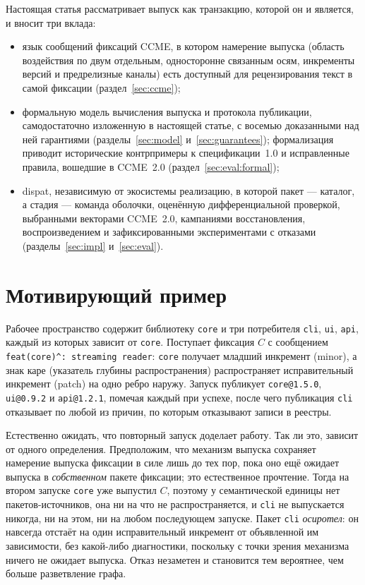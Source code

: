 \documentclass[sigconf,nonacm]{acmart}
\theoremstyle{acmplain}
\theoremstyle{acmdefinition}
\theoremstyle{acmplain}
\newcommand{\code}[1]{\texttt{#1}}
\begin{document}
Настоящая статья рассматривает выпуск как транзакцию, которой он и
является, и вносит три вклада:
\begin{itemize}
  \item язык сообщений фиксаций CCME, в котором намерение выпуска
    (область воздействия по двум отдельным, односторонне связанным осям,
    инкременты версий и
    предрелизные каналы) есть доступный для рецензирования текст в
    самой фиксации (раздел~\ref{sec:ccme});
  \item формальную модель вычисления выпуска и протокола публикации,
    самодостаточно изложенную в настоящей статье, с восемью доказанными
    над ней гарантиями (разделы~\ref{sec:model} и~\ref{sec:guarantees});
    формализация приводит исторические контрпримеры к спецификации~1.0
    и исправленные правила, вошедшие в CCME~2.0
    (раздел~\ref{sec:eval:formal});
  \item dispat, независимую от экосистемы реализацию, в которой пакет ---
    каталог, а стадия --- команда оболочки, оценённую дифференциальной
    проверкой, выбранными векторами CCME~2.0, кампаниями восстановления,
    воспроизведением и зафиксированными экспериментами с отказами
    (разделы~\ref{sec:impl} и~\ref{sec:eval}).
\end{itemize}

\section{Мотивирующий пример}
\label{sec:motivation}

Рабочее пространство содержит библиотеку \code{core} и три потребителя
\code{cli}, \code{ui}, \code{api}, каждый из которых зависит от
\code{core}. Поступает фиксация $C$ с сообщением
\code{feat(core)\^{}:~streaming reader}: \code{core} получает младший
инкремент (minor), а знак каре (указатель глубины распространения)
распространяет исправительный инкремент (patch) на одно ребро наружу.
Запуск публикует \code{core@1.5.0}, \code{ui@0.9.2} и \code{api@1.2.1},
помечая каждый при успехе, после чего публикация \code{cli} отказывает
по любой из причин, по которым отказывают записи в реестры.

Естественно ожидать, что повторный запуск доделает работу. Так ли это,
зависит от одного определения. Предположим, что механизм выпуска
сохраняет намерение выпуска фиксации в силе лишь до тех пор, пока оно
ещё ожидает выпуска в \emph{собственном} пакете фиксации; это
естественное прочтение. Тогда на втором запуске \code{core} уже выпустил
$C$, поэтому у семантической единицы нет пакетов-источников, она ни на
что не распространяется, и \code{cli} не выпускается никогда, ни на
этом, ни на любом последующем запуске. Пакет \code{cli}
\emph{осиротел}: он навсегда отстаёт на один исправительный инкремент от
объявленной им зависимости, без какой-либо диагностики, поскольку с
точки зрения механизма ничего не ожидает выпуска. Отказ незаметен и
становится тем вероятнее, чем больше разветвление графа.
\end{document}
